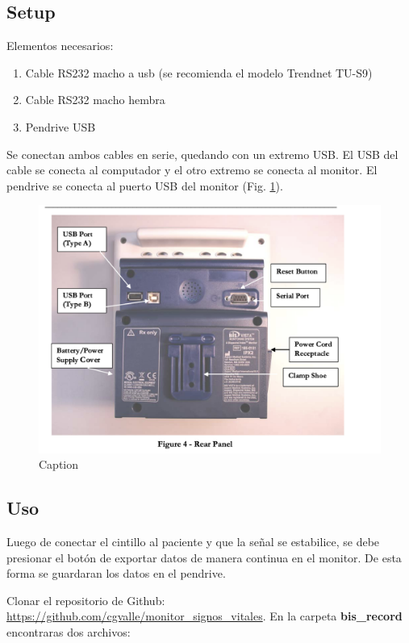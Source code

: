 \documentclass{article}
\begin{document}
\subsection{Setup}

Elementos necesarios:

\begin{enumerate}
	\item Cable RS232 macho a usb (se recomienda el modelo Trendnet TU-S9)
	\item Cable RS232 macho hembra
	\item Pendrive USB 
\end{enumerate}

Se conectan ambos cables en serie, quedando con un extremo USB. El USB del cable se conecta al computador y el otro extremo se conecta al monitor. El pendrive se conecta al puerto USB del monitor (Fig. \ref{fig:bis_rear_panel}).


\begin{figure}
	\centering
    \includegraphics[scale=0.5]{img/bis_rear_panel.png}
    \caption{Caption}
	\label{fig:bis_rear_panel}
\end{figure}


\subsection{Uso}

Luego de conectar el cintillo al paciente y que la señal se estabilice, se debe presionar el botón de exportar datos de manera continua en el monitor. De esta forma se guardaran los datos en el pendrive. 

Clonar el repositorio de Github: \url{https://github.com/cgvalle/monitor_signos_vitales}. En la carpeta \textbf{bis\_record} encontraras dos archivos:
\end{document}

